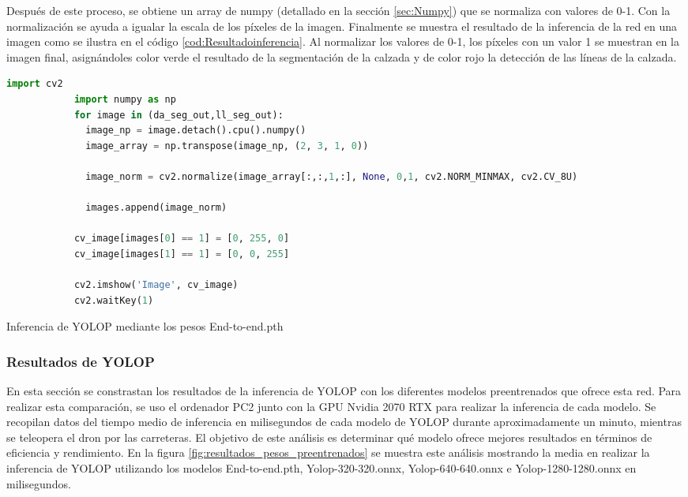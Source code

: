         Después de este proceso, se obtiene un array de numpy (detallado en la sección \ref{sec:Numpy}) que se normaliza con valores de 0-1. Con la normalización 
        se ayuda a igualar la escala de los píxeles de la imagen. Finalmente se muestra el resultado de la inferencia de la red 
        en una imagen como se ilustra en el código \ref{cod:Resultadoinferencia}. Al normalizar los valores de 0-1, los píxeles con un valor 1 se muestran en la imagen final, asignándoles 
        color verde el resultado de la segmentación de la calzada y de color rojo la detección de las líneas de la calzada. \newline
    
        \begin{code}[H]
          \begin{lstlisting}[language=Python]
            import cv2
            import numpy as np
            for image in (da_seg_out,ll_seg_out):
              image_np = image.detach().cpu().numpy()
              image_array = np.transpose(image_np, (2, 3, 1, 0))
    
              image_norm = cv2.normalize(image_array[:,:,1,:], None, 0,1, cv2.NORM_MINMAX, cv2.CV_8U)
    
              images.append(image_norm)
    
            cv_image[images[0] == 1] = [0, 255, 0]
            cv_image[images[1] == 1] = [0, 0, 255]
    
            cv2.imshow('Image', cv_image)
            cv2.waitKey(1)
          \end{lstlisting}
          \caption[Resultado de la inferencia del modelo YOLOP]{Inferencia de YOLOP mediante los pesos End-to-end.pth}
          \label{cod:Resultadoinferencia}
          \end{code}  


\subsubsection{Resultados de YOLOP }
\label{sec:resultados}
En esta sección se constrastan los resultados de la inferencia de YOLOP con los diferentes modelos preentrenados que ofrece esta red. Para realizar esta comparación, se uso el ordenador 
PC2 junto con la GPU Nvidia 2070 RTX para realizar la inferencia de cada modelo. Se recopilan datos del tiempo medio de inferencia en milisegundos de cada 
modelo de YOLOP durante aproximadamente
un minuto, mientras se teleopera el dron por las carreteras. El objetivo de este análisis es determinar qué modelo ofrece mejores resultados en términos de eficiencia y rendimiento. 
En la figura \ref{fig:resultados_pesos_preentrenados} se muestra este análisis mostrando la media en realizar la inferencia de YOLOP utilizando los modelos 
End-to-end.pth, Yolop-320-320.onnx, Yolop-640-640.onnx e Yolop-1280-1280.onnx en milisegundos.

